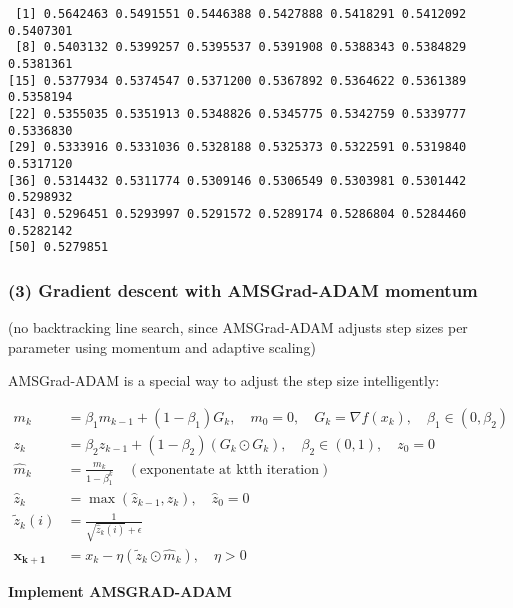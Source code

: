 \documentclass[
  letterpaper,
  DIV=11,
  numbers=noendperiod]{scrartcl}
\begin{document}
\begin{verbatim}
 [1] 0.5642463 0.5491551 0.5446388 0.5427888 0.5418291 0.5412092 0.5407301
 [8] 0.5403132 0.5399257 0.5395537 0.5391908 0.5388343 0.5384829 0.5381361
[15] 0.5377934 0.5374547 0.5371200 0.5367892 0.5364622 0.5361389 0.5358194
[22] 0.5355035 0.5351913 0.5348826 0.5345775 0.5342759 0.5339777 0.5336830
[29] 0.5333916 0.5331036 0.5328188 0.5325373 0.5322591 0.5319840 0.5317120
[36] 0.5314432 0.5311774 0.5309146 0.5306549 0.5303981 0.5301442 0.5298932
[43] 0.5296451 0.5293997 0.5291572 0.5289174 0.5286804 0.5284460 0.5282142
[50] 0.5279851
\end{verbatim}

\subsubsection{(3) Gradient descent with AMSGrad-ADAM
momentum}\label{gradient-descent-with-amsgrad-adam-momentum}

(no backtracking line search, since AMSGrad-ADAM adjusts step sizes per
parameter using momentum and adaptive scaling)

AMSGrad-ADAM is a special way to adjust the step size intelligently:

\[
\begin{aligned}
m_k &= \beta_1m_{k-1} + (1-\beta_1)G_k, \quad m_0 = 0, \quad G_k = \nabla f(x_k), \quad \beta_1∈(0, \beta_2)\\
z_k &= \beta_2 z_{k-1} + (1-\beta_2)(G_k \odot G_k), \quad \beta_2∈(0, 1), \quad z_0=0\\
\hat{m}_k &= \frac{m_k}{1 - \beta_1^k} \quad(\text{exponentate at ktth iteration})\\
\hat{z}_k &= \max(\hat{z}_{k-1}, z_k), \quad \hat{z}_0 = 0 \\
\tilde{z}_k(i) &= \frac{1}{\sqrt{\hat{z}_k(i)} + \epsilon}\\ 
\mathbf{x_{k+1}} &= \boxed{x_k - \eta(\tilde{z}_k \odot \hat{m}_k), \quad \eta > 0}
\end{aligned}
\]

\textbf{Implement AMSGRAD-ADAM}
\end{document}
